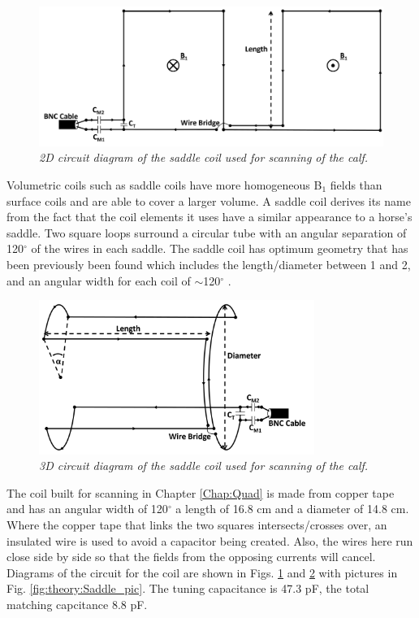\begin{figure}
    \centering
    \includegraphics[width=1\textwidth]{Figures/Theory/Planar_Saddle.png}
    \caption{\textit{2D circuit diagram of the saddle coil used for scanning of the calf.}}
    \label{fig:theory:2D_Saddle}
\end{figure}

Volumetric coils such as saddle coils have more homogeneous B$_1$ fields than surface coils and are able to cover a larger volume. A saddle coil derives its name from the fact that the coil elements it uses have a similar appearance to a horse's saddle. Two square loops surround a circular tube with an angular separation of 120$^\circ$ of the wires in each saddle. The saddle coil has optimum geometry that has been previously been found which includes the length/diameter between 1 and 2, and an angular width for each coil of $\sim$120$^\circ$ \cite{Ginsberg1970OptimumField,Salmon2006OptimizationImaging}.

\begin{figure}
    \centering
    \includegraphics[width=0.8\textwidth]{Figures/Theory/3D_Saddle.png}
    \caption{\textit{3D circuit diagram of the saddle coil used for scanning of the calf.}}
    \label{fig:theory:3D_Saddle}
\end{figure}

The coil built for scanning in Chapter \ref{Chap:Quad} is made from copper tape and has an angular width of 120$^\circ$ a length of 16.8 cm and a diameter of 14.8 cm. Where the copper tape that links the two squares intersects/crosses over, an insulated wire is used to avoid a capacitor being created. Also, the wires here run close side by side so that the fields from the opposing currents will cancel. Diagrams of the circuit for the coil are shown in Figs. \ref{fig:theory:2D_Saddle} and \ref{fig:theory:3D_Saddle} with pictures in Fig. \ref{fig:theory:Saddle_pic}. The tuning capacitance is 47.3 pF, the total matching capcitance 8.8 pF.

